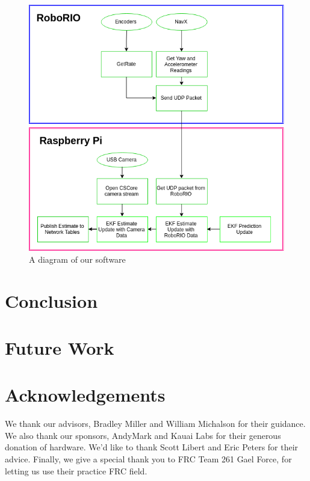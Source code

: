 \documentclass{article}
\begin{document}
    \begin{figure}[H]
      \centering
      \includegraphics[width=1\linewidth]{./images/MQP_System_Chart.png}
      \caption{A diagram of our software}
      \label{fig:software_diagram}
    \end{figure}




\section{Conclusion} \label{section:conclusion}




\section{Future Work} \label{section:future_work}




\section{Acknowledgements}

  We thank our advisors, Bradley Miller and William Michalson for their guidance. We also thank our sponsors, AndyMark and Kauai Labs for their generous donation of hardware. We'd like to thank Scott Libert and Eric Peters for their advice. Finally, we give a special thank you to FRC Team 261 Gael Force, for letting us use their practice FRC field.
\end{document}
